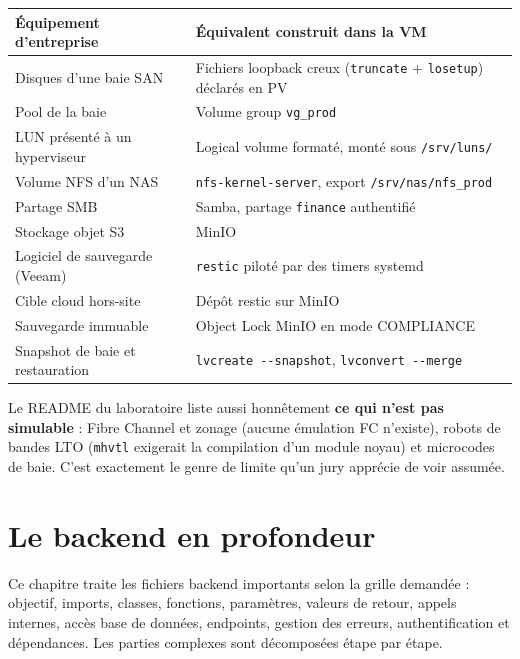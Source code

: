 \documentclass[11pt,a4paper]{report}
\newcommand{\file}[1]{\texttt{\small #1}}
\begin{document}
\begin{longtable}{@{}p{4.6cm}p{10.2cm}@{}}
\toprule
\textbf{Équipement d'entreprise} & \textbf{Équivalent construit dans la VM}\\
\midrule
\endhead
Disques d'une baie SAN & Fichiers loopback creux (\texttt{truncate} + \texttt{losetup}) déclarés en PV\\
Pool de la baie & Volume group \texttt{vg\_prod}\\
LUN présenté à un hyperviseur & Logical volume formaté, monté sous \file{/srv/luns/}\\
Volume NFS d'un NAS & \texttt{nfs-kernel-server}, export \file{/srv/nas/nfs\_prod}\\
Partage SMB & Samba, partage \texttt{finance} authentifié\\
Stockage objet S3 & MinIO\\
Logiciel de sauvegarde (Veeam) & \texttt{restic} piloté par des timers systemd\\
Cible cloud hors-site & Dépôt restic sur MinIO\\
Sauvegarde immuable & Object Lock MinIO en mode COMPLIANCE\\
Snapshot de baie et restauration & \texttt{lvcreate -{}-snapshot}, \texttt{lvconvert -{}-merge}\\
\bottomrule
\end{longtable}

\begin{infobox}
Le README du laboratoire liste aussi honnêtement \textbf{ce qui n'est pas
simulable} : Fibre Channel et zonage (aucune émulation FC n'existe), robots de
bandes LTO (\texttt{mhvtl} exigerait la compilation d'un module noyau) et
microcodes de baie. C'est exactement le genre de limite qu'un jury apprécie de
voir assumée.
\end{infobox}

\chapter{Le backend en profondeur}
\label{ch:backend}

Ce chapitre traite les fichiers backend importants selon la grille demandée :
objectif, imports, classes, fonctions, paramètres, valeurs de retour, appels
internes, accès base de données, endpoints, gestion des erreurs,
authentification et dépendances. Les parties complexes sont décomposées étape
par étape.
\end{document}
